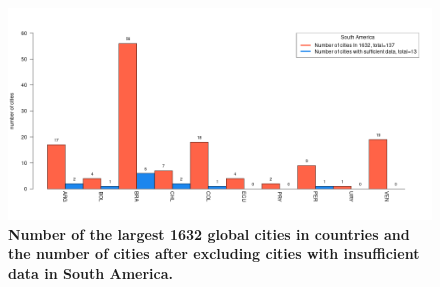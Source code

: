 \documentclass[preprint,12pt]{elsarticle}
\begin{document}
\begin{figure}
\centering
\includegraphics[trim={ 0 35 25 50 },clip,scale=0.45]{Images/South America_cities.png}
\caption{\bf Number of the largest 1632 global cities in countries and the number of cities after excluding cities with insufficient data in South America.}
 \label{fig:southhamerica}
\end{figure}
\end{document}
